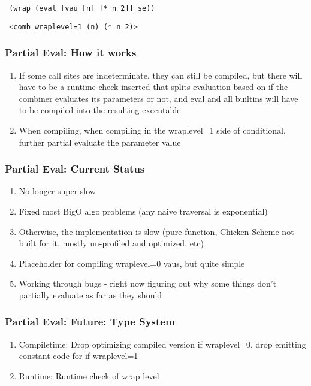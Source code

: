 \documentclass{beamer}
\begin{document}
\begin{frame}[fragile]
\footnotesize
\begin{verbatim}
 (wrap (eval [vau [n] [* n 2]] se))
\end{verbatim}
\end{frame}

\begin{frame}[fragile]
\footnotesize
\begin{verbatim}
 <comb wraplevel=1 (n) (* n 2)>
\end{verbatim}
\end{frame}

\begin{frame}
\frametitle{Partial Eval: How it works}
  \begin{enumerate}
	\item<1-> If some call sites are indeterminate, they can still be compiled, but there will have to be a runtime check inserted that splits evaluation based on if the combiner evaluates its parameters or not, and eval and all builtins will have to be compiled into the resulting executable.
    \item<2-> When compiling, when compiling in the wraplevel=1 side of conditional, further partial evaluate the parameter value
  \end{enumerate}
\end{frame}

\begin{frame}
\frametitle{Partial Eval: Current Status}
  \begin{enumerate}
    \item<1-> No longer super slow
    \item<2-> Fixed most BigO algo problems (any naive traversal is exponential)
	\item<3-> Otherwise, the implementation is slow (pure function, Chicken Scheme not built for it, mostly un-profiled and optimized, etc)
	\item<4-> Placeholder for compiling wraplevel=0 vaus, but quite simple
	\item<5-> Working through bugs - right now figuring out why some things don't partially evaluate as far as they should
  \end{enumerate}
\end{frame}

\begin{frame}
\frametitle{Partial Eval: Future: Type System}
  \begin{enumerate}
    \item<1-> Compiletime: Drop optimizing compiled version if wraplevel=0, drop emitting constant code for if wraplevel=1
    \item<2-> Runtime: Runtime check of wrap level
  \end{enumerate}
\end{frame}
\end{document}
